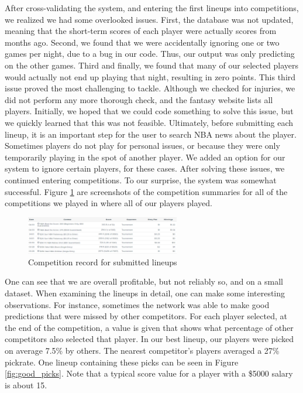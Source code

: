 After cross-validating the system, and entering the first lineups into competitions, we realized we had some overlooked issues. First, the database was not updated, meaning that the short-term scores of each player were actually scores from months ago. Second, we found that we were accidentally ignoring one or two games per night, due to a bug in our code. Thus, our output was only predicting on the other games. Third and finally, we found that many of our selected players would actually not end up playing that night, resulting in zero points. This third issue proved the most challenging to tackle. Although we checked for injuries, we did not perform any more thorough check, and the fantasy website lists all players. Initially, we hoped that we could code something to solve this issue, but we quickly learned that this was not feasible. Ultimately, before submitting each lineup, it is an important step for the user to search NBA news about the player. Sometimes players do not play for personal issues, or because they were only temporarily playing in the spot of another player. We added an option for our system to ignore certain players, for these cases. After solving these issues, we continued entering competitions. To our surprise, the system was somewhat successful. Figure \ref{fig:win_record} are screenshots of the competition summaries for all of the competitions we played in where all of our players played.
\begin{figure}[ht]
    \centering
    \includegraphics[width=0.6\textwidth]{figures/fanduel_comp}
    \caption{Competition record for submitted lineups}
    \label{fig:win_record}
\end{figure}
One can see that we are overall profitable, but not reliably so, and on a small dataset. When examining the lineups in detail, one can make some interesting observations. For instance, sometimes the network was able to make good predictions that were missed by other competitors. For each player selected, at the end of the competition, a value is given that shows what percentage of other competitors also selected that player. In our best lineup, our players were picked on average 7.5\% by others. The nearest competitor's players averaged a 27\% pickrate. One lineup containing these picks can be seen in Figure \ref{fig:good_picks}. Note that a typical score value for a player with a \$5000 salary is about 15.

